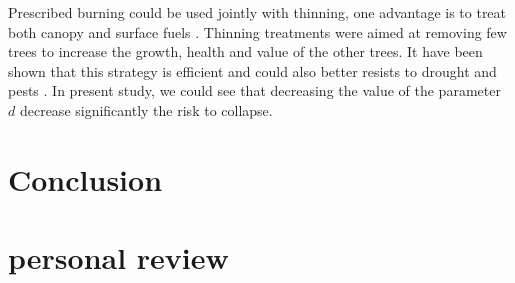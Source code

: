 \documentclass{article}
\begin{document}
Prescribed burning could be used jointly with thinning, one advantage is to treat both canopy and surface fuels \citep{kalies_tamm_2016, agee_basic_2005}. Thinning treatments were aimed at removing few trees to increase the growth, health and value of the other trees. It have been shown that this strategy is efficient \citep{hurteau2008carbon} and could also better resists to drought \citep{d2013effects} and pests \citep{waring2005silvicultural}. In present study, we could see that decreasing the value of the parameter $d$ decrease significantly the risk to collapse.







\todo{}






\newpage

\section*{Conclusion}







\newpage

\section*{personal review}
\end{document}
